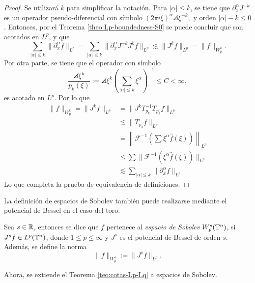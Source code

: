 \begin{proof}
	Se utilizará $k$ para simplificar la notación. Para $|\alpha|\leq k$, se tiene que $\partial^\alpha_xJ^{-k}$ es un operador pseudo-diferencial con símbolo $(2\pi i\xi)^\alpha\angles{\xi}^{-k},$ y orden $|\alpha|-k\leq0$. Entonces, por el Teorema \ref{theo:Lp-boundedness-S0} se puede concluir que son acotados en $L^p$, y que
	\begin{equation*}
		\sum_{|\alpha|\leq k} \|\partial^\alpha_xf\|_{L^p} = \sum_{|\alpha|\leq k} \|\partial^\alpha_xJ^{-k}J^kf\|_{L^p} \lesssim \|J^kf\|_{L^p} = \|f\|_{W^k_p}.
	\end{equation*}
	Por otra parte, se tiene que el operador con símbolo
	\begin{equation*}
		\frac{\angles{\xi}^k}{p_k(\xi)}:= \angles{\xi}^k \left(\sum_{|\alpha|\leq k} \xi^\alpha
		\right)^{-1} \leq C <\infty,
	\end{equation*}
	es acotado en $L^p$. Por lo que  
	\begin{align*}
		\|f\|_{W^k_p} =\|J^kf\|_{L^p} & = \|J^kT_{p_k}^{-1}T_{p_k} f\|_{L^p} \\
		& \lesssim \|T_{p_k} f\|_{L^p} \\ 
		& = \left\|\mathcal{F}^{-1}\left(\sum\xi^\alpha \widehat{f}(\xi)\right)\right\|_{L^p}  \\
		& \leq \sum \|\mathcal{F}^{-1}(\xi^\alpha\widehat{f}(\xi))\|_{L^p} \\
		& \lesssim \sum_{|\alpha|\leq k} \|\partial^\alpha_xf\|_{L^p}
	\end{align*}
	Lo que completa la prueba de equivalencia de definiciones.
\end{proof}
La definición de espacios de Sobolev también puede realizarse mediante el potencial de Bessel en el caso del toro.
\begin{definition}
Sea $s\in\mathbb{R}$, entonces se dice que $f$ pertenece al \textit{espacio de Sobolev} $W^s_p(\mathbb{T}^n)$, si $J^sf\in L^p(\mathbb{T}^n)$, donde $1\leq p\leq\infty$ y $J^s$ es el potencial de Bessel de orden $s$. Además, se define la norma
\begin{equation*}
	\|f\|_{W^s_p} := \|J^sf\|_{L^p}.
\end{equation*} 
\end{definition}
Ahora, se extiende el Teorema \ref{teo:cotas-Lp-Lq} a espacios de Sobolev.
